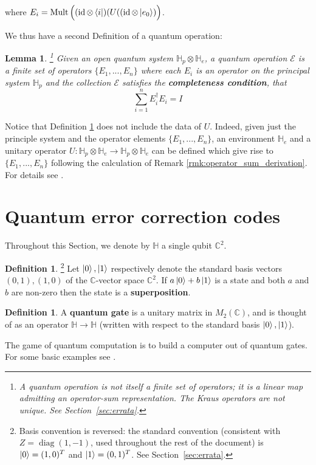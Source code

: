 \documentclass[12pt]{article}
\theoremstyle{plain}
\newtheorem{lemma}[thm]{Lemma}
\theoremstyle{definition}
\newtheorem{defn}[thm]{Definition} %
\newcommand{\bb}[1]{\mathbb{#1}}
\newcommand{\call}[1]{\mathcal{#1}}
\newcommand{\lto}{\longrightarrow}
\begin{document}
where $E_i = \operatorname{Mult}\Big((\operatorname{id} \otimes \bra{i}) (U ((\operatorname{id} \otimes \ket{e_0})\Big)$.

We thus have a second Definition of a quantum operation:
\begin{lemma}\label{lem:operator_sum}\footnote{A quantum operation is not itself a finite set of operators; it is a linear map admitting an operator-sum representation. The Kraus operators are not unique. See Section~\ref{sec:errata}.}
Given an open quantum system $\bb{H}_p \otimes \bb{H}_e$, a quantum operation $\call{E}$ is a finite set of operators $\lbrace E_1,...,E_n\rbrace$ where each $E_i$ is an operator on the principal system $\bb{H}_p$ and the collection $\call{E}$ satisfies the \textbf{completeness condition}, that
\begin{equation}
\sum_{i = 1}^n E_i^\dagger E_i = I
\end{equation}
\end{lemma}
Notice that Definition \ref{lem:operator_sum} does not include the data of $U$. Indeed, given just the principle system and the operator elements $\lbrace E_1,...,E_n\rbrace$, an environment $\bb{H}_e$ and a unitary operator $U: \bb{H}_p \otimes \bb{H}_e \lto \bb{H}_p \otimes \bb{H}_e$ can be defined which give rise to $\lbrace E_1,...,E_n\rbrace$ following the calculation of Remark \ref{rmk:operator_sum_derivation}. For details see \cite[\S 8.2.3 page 365]{quantum_computing}.

\section{Quantum error correction codes}
Throughout this Section, we denote by $\bb{H}$ a single qubit $\bb{C}^2$.
\begin{defn}\footnote{Basis convention is reversed: the standard convention (consistent with $Z=\operatorname{diag}(1,-1)$, used throughout the rest of the document) is $\ket{0}=(1,0)^T$ and $\ket{1}=(0,1)^T$. See Section~\ref{sec:errata}.}
Let $\ket{0}, \ket{1}$ respectively denote the standard basis vectors $(0,1),(1,0)$ of the $\bb{C}$-vector space $\bb{C}^2$. If $a\ket{0} + b\ket{1}$ is a state and both $a$ and $b$ are non-zero then the state is a \textbf{superposition}.
\end{defn}

\begin{defn}
A \textbf{quantum gate} is a unitary matrix in $M_2(\bb{C})$, and is thought of as an operator $\bb{H} \lto \bb{H}$ (written with respect to the standard basis $\ket{0},\ket{1}$).
\end{defn}
The game of quantum computation is to build a computer out of quantum gates. For some basic examples see \cite[\S 4]{quantum_computing}.
\end{document}

